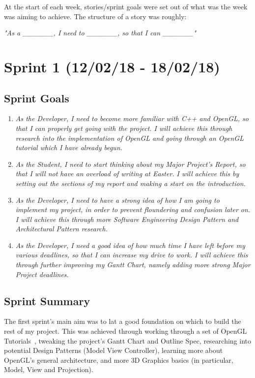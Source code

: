 \documentclass[a4paper,10pt]{report}
\begin{document}
At the start of each week, stories/sprint goals were set out of what was the week was aiming to achieve. The structure of a story was roughly:\medskip

\textit{"As a \_\_\_\_\_\_, I need to \_\_\_\_\_\_, so that I can \_\_\_\_\_\_"}

\section{Sprint 1 (12/02/18 - 18/02/18)}

\subsection{Sprint Goals}

\begin{enumerate}
  \item \textit{As the Developer, I need to become more familiar with C++ and OpenGL, so that I can properly get going with the project. I will achieve this through research into the implementation of OpenGL and going through an OpenGL tutorial which I have already begun.}
  
  \item \textit{As the Student, I need to start thinking about my Major Project's Report, so that I will not have an overload of writing at Easter. I will achieve this by setting out the sections of my report and making a start on the introduction.}
  \item \textit{As the Developer, I need to have a strong idea of how I am going to implement my project, in order to prevent floundering and confusion later on. I will achieve this through more Software Engineering Design Pattern and Architectural Pattern research. }
\item \textit{As the Developer, I need a good idea of how much time I have left before my various deadlines, so that I can increase my drive to work. I will achieve this through further improving my Gantt Chart, namely adding more strong Major Project deadlines. }

\end{enumerate}

\subsection{Sprint Summary}

The first sprint's main aim was to lat a good foundation on which to build the rest of my project. This was achieved through working through a set of OpenGL Tutorials~\cite{opengl_tutorial}, tweaking the project's Gantt Chart and Outline Spec, researching into potential Design Patterns (Model View Controller), learning more about OpenGL's general architecture, and more 3D Graphics basics (in particular, Model, View and Projection). \medskip
\end{document}
